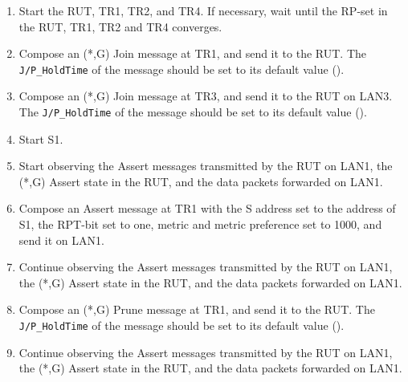 \documentclass[11pt]{report}
\begin{document}
\begin{enumerate}

  \item Start the RUT, TR1, TR2, and TR4. If necessary, wait until the RP-set
  in the RUT, TR1, TR2 and TR4 converges.

  \item Compose an (*,G) Join message at TR1, and send it to the RUT.
  The \verb=J/P_HoldTime= of the message should be set to its default
  value ({\PimsmJPHoldTime}).

  \item Compose an (*,G) Join message at TR3, and send it to the RUT on LAN3.
  The \verb=J/P_HoldTime= of the message should be set to its default
  value ({\PimsmJPHoldTime}).

  \item Start S1.

  \item Start observing the Assert messages transmitted by the RUT on
  LAN1, the (*,G) Assert state in the RUT, and the data packets forwarded on
  LAN1. 

  \item Compose an Assert message at TR1 with the S address set to the
  address of S1, the RPT-bit set to one, metric and metric preference set to
  1000, and send it on LAN1.

  \item Continue observing the Assert messages transmitted by the RUT on
  LAN1, the (*,G) Assert state in the RUT, and the data packets forwarded on
  LAN1.

  \item Compose an (*,G) Prune message at TR1, and send it to the RUT.
  The \verb=J/P_HoldTime= of the message should be set to its default
  value ({\PimsmJPHoldTime}).

  \item Continue observing the Assert messages transmitted by the RUT on
  LAN1, the (*,G) Assert state in the RUT, and the data packets forwarded on
  LAN1.

\end{enumerate}

\end{document}

